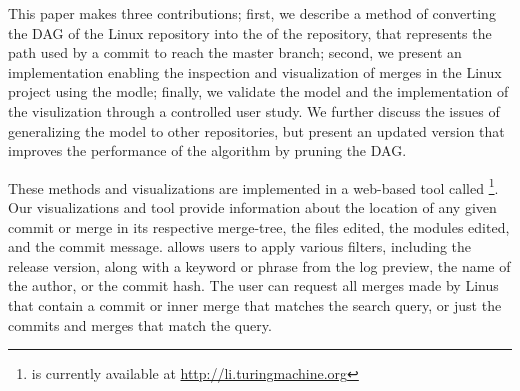This paper makes three contributions; first, we describe a method of
converting the DAG of the Linux repository into the \mt of the
repository, that represents the path used by a commit to reach the
master branch; second, we present an implementation enabling the
inspection and visualization of merges in the Linux project using the
\mt modle; finally, we validate the \mt model and the implementation of
the visulization through a controlled user study. We further discuss the
issues of generalizing the model to other repositories, but present an
updated version that improves the performance of the algorithm by
pruning the DAG.\@

These methods and visualizations are implemented in a web-based tool
called \tool\footnote{\tool is currently available at
  \url{http://li.turingmachine.org}}. Our visualizations and tool
provide information about the location of any given commit or merge in
its respective merge-tree, the files edited, the modules edited, and the
commit message. \tool allows users to apply various filters, including
the release version, along with a keyword or phrase from the log
preview, the name of the author, or the commit hash. The user can
request all merges made by Linus that contain a commit or inner merge
that matches the search query, or just the commits and merges that match
the query.
